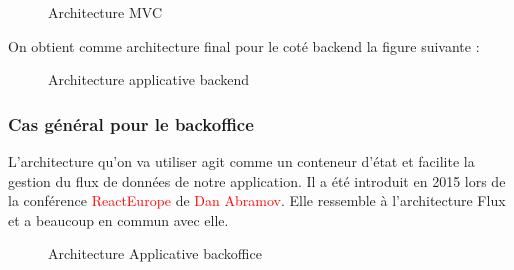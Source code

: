 \begin{figure}[H]
	\caption{\label{fig:my-label} Architecture MVC}
\end{figure}

On obtient comme architecture final pour le cot\'e backend la figure suivante :


\begin{figure}[H]
	\caption{\label{fig:my-label} Architecture applicative backend}
\end{figure}

\subsubsection{Cas g\'en\'eral pour le backoffice}

L'architecture qu'on va utiliser agit comme un conteneur d'\'etat et facilite la gestion du flux de donn\'ees de notre application. Il a \'et\'e introduit en 2015 lors de la conf\'erence \textcolor{red}{ReactEurope} de \textcolor{red}{Dan Abramov}. Elle ressemble \`a l'architecture Flux et a beaucoup en commun avec elle.

\begin{figure}[H]
	\caption{\label{fig:my-label} Architecture Applicative backoffice}
\end{figure}

